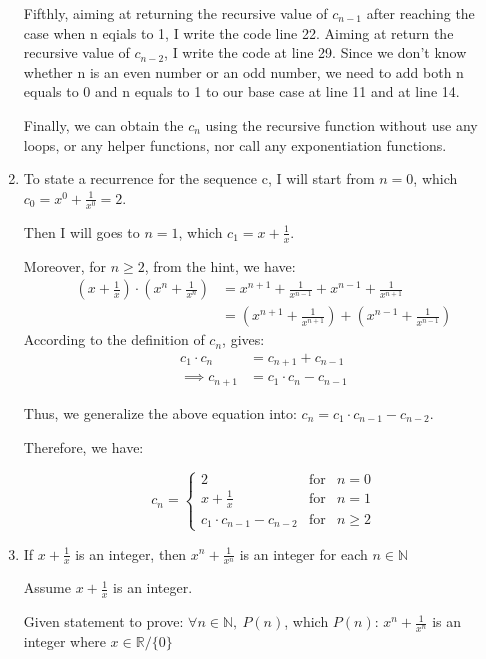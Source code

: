 \documentclass[12pt]{article}
\begin{document}
\begin{enumerate}[label=(\alph*)]
\noindent Fifthly, aiming at returning the recursive value of $c_{n-1}$ after reaching the case when n eqials to 1, I write the code line 22.
Aiming at return the recursive value of $c_{n-2}$, I write the code at line 29.
Since we don't know whether n is an even number or an odd number, we need to add both n equals to 0 and n equals to 1 to our base case at line 11 and at line 14.

\noindent Finally, we can obtain the $c_n$ using the recursive function without use any loops, or any helper functions, nor call any exponentiation functions.

    \item To state a recurrence for the sequence c, I will start from $n=0$, which $c_0 = x^0 + \frac{1}{x^0} = 2$.
    
    Then I will goes to $n=1$, which $c_1 = x + \frac{1}{x}$.

    Moreover, for $ n\geq 2$, from the hint, we have:
    \begin{align*}
        (x + \frac{1}{x}) \cdot (x^n + \frac{1}{x^n}) &= x^{n+1} + \frac{1}{x^{n-1}} + x^{n-1} + \frac{1}{x^{n+1}} \\
        &= (x^{n+1} + \frac{1}{x^{n+1}}) + (x^{n-1} + \frac{1}{x^{n-1}})
    \end{align*}
    \noindent According to the definition of $c_n$, gives:
    \begin{align*}
        c_1 \cdot c_n &= c_{n+1} + c_{n-1} \\
        \implies c_{n+1} &= c_1 \cdot c_n - c_{n-1}
    \end{align*}

    Thus, we generalize the above equation into: $c_{n} = c_1 \cdot c_{n-1} - c_{n-2}$.

    Therefore, we have:

    $$c_n =  \left\{ \begin{array}{lcl}
        2 & \mbox{for} & n = 0 \\
        x + \frac{1}{x} & \mbox{for} & n=1 \\
        c_1 \cdot c_{n-1} - c_{n-2} & \mbox{for} & n\geq2
    \end{array}\right. $$

    \item If $x+\frac{1}{x}$ is an integer, then $x^n + \frac{1}{x^n} $ is an integer for each $n \in \mathbb{N}$
    
    Assume $x+\frac{1}{x}$ is an integer.

    Given statement to prove: $\forall n \in \mathbb{N},\ P(n)$, which $P(n)$: $x^n + \frac{1}{x^n}$ is an integer where $x \in \mathbb{R} / \{0\}$


\end{enumerate}
\end{document}
